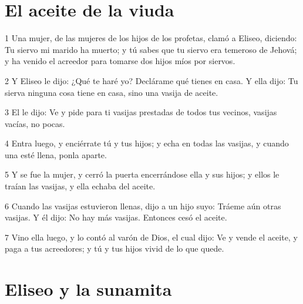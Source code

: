 \section*{El aceite de la viuda}

\par 1 Una mujer, de las mujeres de los hijos de los profetas, clamó a Eliseo, diciendo: Tu siervo mi marido ha muerto; y tú sabes que tu siervo era temeroso de Jehová; y ha venido el acreedor para tomarse dos hijos míos por siervos.
\par 2 Y Eliseo le dijo: ¿Qué te haré yo? Declárame qué tienes en casa. Y ella dijo: Tu sierva ninguna cosa tiene en casa, sino una vasija de aceite.
\par 3 El le dijo: Ve y pide para ti vasijas prestadas de todos tus vecinos, vasijas vacías, no pocas.
\par 4 Entra luego, y enciérrate tú y tus hijos; y echa en todas las vasijas, y cuando una esté llena, ponla aparte.
\par 5 Y se fue la mujer, y cerró la puerta encerrándose ella y sus hijos; y ellos le traían las vasijas, y ella echaba del aceite.
\par 6 Cuando las vasijas estuvieron llenas, dijo a un hijo suyo: Tráeme aún otras vasijas. Y él dijo: No hay más vasijas. Entonces cesó el aceite.
\par 7 Vino ella luego, y lo contó al varón de Dios, el cual dijo: Ve y vende el aceite, y paga a tus acreedores; y tú y tus hijos vivid de lo que quede.

\section*{Eliseo y la sunamita}

